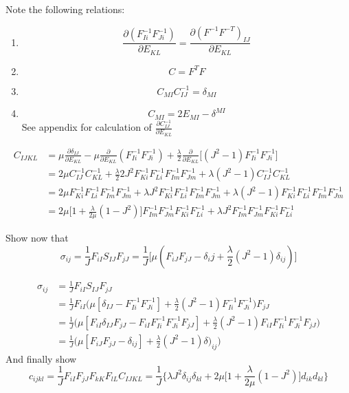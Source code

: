 \documentclass[10pt,a4paper]{article}
\begin{document}
   Note the following relations: \begin{enumerate}
   	\item $$\frac{\partial(F^{-1}_{Ii}F^{-1}_{Ji})}{\partial E_{KL}} = \frac{\partial(F^{-1}F^{-T})_{IJ}}{\partial E_{KL}} $$
    \item $$C = F^TF $$
    \item $$C_{MI}C^{-1}_{IJ} = \delta_{MI}$$
    \item $$C_{MI} = 2E_{MI}-\delta^{MI} $$
    See appendix for calculation of $\frac{\partial C^{-1}_{IJ}}{\partial E_{KL}}$
   \end{enumerate}
   \begin{equation}
   \begin{split}
   C_{IJKL} & =  \mu\frac{\partial \delta_{IJ}}{\partial E_{KL}} -\mu\frac{\partial}{\partial E_{KL}}(F^{-1}_{Ii}F^{-1}_{Ji})  + \frac{\lambda}{2}\frac{\partial}{\partial E_{KL}}\Big[(J^2-1)F^{-1}_{Ii}F^{-1}_{Ji}\Big]\\ 
   & = 2\mu C^{-1}_{IJ}C^{-1}_{KL}+\frac{\lambda}{2}2J^2F^{-1}_{Ki}F^{-1}_{Li}F^{-1}_{I m}F^{-1}_{Jm} + \lambda(J^2-1)C^{-1}_{IJ}C^{-1}_{KL}\\
   & = 2\mu F^{-1}_{Ki}F^{-1}_{Li}F^{-1}_{I m}F^{-1}_{Jm}+\lambda J^2F^{-1}_{Ki}F^{-1}_{Li}F^{-1}_{I m}F^{-1}_{Jm} + \lambda(J^2-1)F^{-1}_{Ki}F^{-1}_{Li}F^{-1}_{I m}F^{-1}_{Jm}\\
   & = 2\mu \Big[ 1 + \frac{\lambda}{2\mu}(1-J^2)\Big]F^{-1}_{Im}F^{-1}_{Jm}F^{-1}_{Ki}F^{-1}_{Li}+\lambda J^2 F^{-1}_{Im}F^{-1}_{Jm}F^{-1}_{Ki}F^{-1}_{Li} 
   \end{split}
   \end{equation}

Show now that $$\sigma_{ij} = \frac{1}{J}F_{iI}S_{IJ}F_{jJ}=\frac{1}{J}\Big[ \mu(F_{iJ}F_{jJ}-\delta_{i}j+\frac{\lambda}{2}(J^2-1)\delta_{ij}) \Big] $$
   
   \begin{equation}
   \begin{split}
    \sigma_{ij} &= \frac{1}{J}F_{iI}S_{IJ}F_{jJ} \\
    & = \frac{1}{J}F_{iI}\Big(\mu[\delta_{IJ}-F^{-1}_{Ii}F^{-1}_{Ji}] + \frac{\lambda}{2}(J^2-1)F^{-1}_{Ii}F^{-1}_{Ji}\Big)F_{jJ}\\
     & = \frac{1}{J}\Big(\mu[F_{iI}\delta_{IJ}F_{jJ}-F_{iI}F^{-1}_{Ii}F^{-1}_{Ji}F_{jJ}] + \frac{\lambda}{2}(J^2-1)F_{iI}F^{-1}_{Ii}F^{-1}_{Ji}F_{jJ}\Big)\\
     & = \frac{1}{J}\Big(\mu[F_{iJ}F_{jJ}-\delta_{ij}] + \frac{\lambda}{2}(J^2-1)\delta)_{ij}\Big)
    \end{split}
   \end{equation}
   And finally show 
   $$c_{ijkl} = \frac{1}{J}F_{iI}F_{jJ}F_{kK}F_{lL}C_{IJKL} = \frac{1}{J} \Big\{ \lambda J^2\delta_{ij}\delta_{kl}+2\mu \Big[ 1+\frac{\lambda}{2\mu}(1-J^2) \Big]d_{ik}d_{kl} \Big\}$$
   
\end{document}
